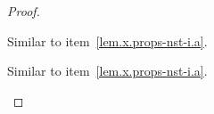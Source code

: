\begin{proof}
\begin{enumerate:a}
  \item Similar to item~\ref{lem.x.props-nst-i.a}.

  \item Similar to item~\ref{lem.x.props-nst-i.a}.


\end{enumerate:a}
\end{proof}
